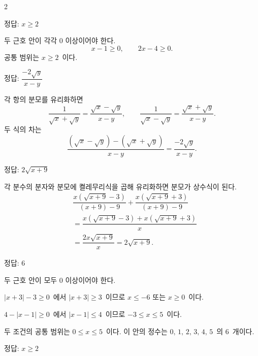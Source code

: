 \documentclass[10pt,fleqn]{article}
\begin{document}
\dmsoltitlefirsttrue
\begin{multicols*}{2}

\begin{dmanswerbox}
정답: $x \ge 2$
\end{dmanswerbox}

두 근호 안이 각각 $0$ 이상이어야 한다.
\[ x-1 \ge 0,\qquad 2x-4 \ge 0. \]
공통 범위는 $x \ge 2$\ 이다.

\begin{dmanswerbox}
정답: $\dfrac{-2\sqrt{y}}{x-y}$
\end{dmanswerbox}

각 항의 분모를 유리화하면
\[ \dfrac{1}{\sqrt{x}+\sqrt{y}}=\dfrac{\sqrt{x}-\sqrt{y}}{x-y},\qquad \dfrac{1}{\sqrt{x}-\sqrt{y}}=\dfrac{\sqrt{x}+\sqrt{y}}{x-y}. \]
두 식의 차는
\[ \dfrac{(\sqrt{x}-\sqrt{y})-(\sqrt{x}+\sqrt{y})}{x-y}=\dfrac{-2\sqrt{y}}{x-y}. \]

\begin{dmanswerbox}
정답: $2\sqrt{x+9}$
\end{dmanswerbox}

각 분수의 분자와 분모에 켤레무리식을 곱해 유리화하면 분모가 상수식이 된다.
\begin{align*}
&\dfrac{x(\sqrt{x+9}-3)}{(x+9)-9}+\dfrac{x(\sqrt{x+9}+3)}{(x+9)-9} \\
&=\dfrac{x(\sqrt{x+9}-3)+x(\sqrt{x+9}+3)}{x} \\
&=\dfrac{2x\sqrt{x+9}}{x}=2\sqrt{x+9}.
\end{align*}

\begin{dmanswerbox}
정답: $6$
\end{dmanswerbox}

두 근호 안이 모두 $0$ 이상이어야 한다.

$|x+3|-3 \ge 0$\ 에서 $|x+3| \ge 3$\ 이므로 $x \le -6$ 또는 $x \ge 0$\ 이다.

$4-|x-1| \ge 0$\ 에서 $|x-1| \le 4$\ 이므로 $-3 \le x \le 5$\ 이다.

두 조건의 공통 범위는 $0 \le x \le 5$\ 이다. 이 안의 정수는 $0,\, 1,\, 2,\, 3,\, 4,\, 5$\ 의 $6$\ 개이다.
\begin{dmanswerbox}
정답: $x \ge 2$
\end{dmanswerbox}


\end{multicols*}
\end{document}
